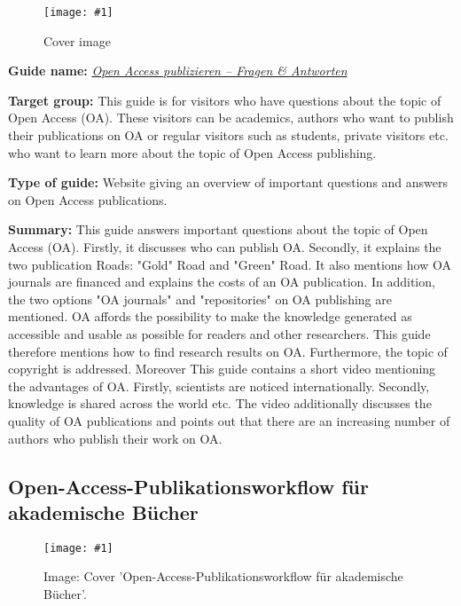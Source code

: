 \documentclass{article}
\newlength{\imgwidth}
\newcommand\scaledgraphics[2]{%
                
\settowidth{\imgwidth}{\texttt{[image: \#1]}}%
                
\setlength{\imgwidth}{\minof{\imgwidth}{#2\textwidth}}%
                
\texttt{[image: \#1]}%
                
}
\begin{document}
\begin{figure}
\scaledgraphics{f61a96b6-6ada-4caf-b8f3-1ef6ac943b93.png}{1}
\caption*{Cover image}\label{F90452781}
\end{figure}


\textbf{Guide name:} \emph{\href{https://www.bildung-forschung.digital/de/open-access-publizieren---fragen-antworten-2678.html}{Open Access publizieren – Fragen \& Antworten}} 

\autocite{bundesministerium_fur_bildung_und_forschung_open_2021}


\textbf{Target group: }This guide is for visitors who have questions about the topic of Open Access (OA). These visitors can be academics, authors who want to publish their publications on OA or regular visitors such as students, private visitors etc. who want to learn more about the topic of Open Access publishing.


\textbf{Type of guide: }Website giving an\textbf{ }overview of important questions and answers on Open Access publications.


\textbf{Summary: }This guide answers important questions about the topic of Open Access (OA). Firstly, it discusses who can publish OA. Secondly, it explains the two publication Roads: "Gold" Road and "Green" Road. It also mentions how OA journals are financed and explains the costs of an OA publication. In addition, the two options "OA journals" and "repositories" on OA publishing are mentioned. OA affords the possibility to make the knowledge generated as accessible and usable as possible for readers and other researchers. This guide therefore mentions how to find research results on OA. Furthermore, the topic of copyright is addressed. Moreover This guide contains a short video mentioning the advantages of OA. Firstly, scientists are noticed internationally. Secondly, knowledge is shared across the world etc. The video additionally discusses the quality of OA publications and points out that there are an increasing number of authors who publish their work on OA.


\subsection{Open-Access-Publikationsworkflow für akademische Bücher}\label{H6691479}



\begin{center}
\begin{figure}
\scaledgraphics{39363ae5-01d9-4e5a-a46f-bf20971df65a.jpg}{0.5}
\caption*{Image: Cover 'Open-Access-Publikationsworkflow für akademische Bücher'.}\label{F7674061}
\end{figure}


\end{center}
\end{document}
